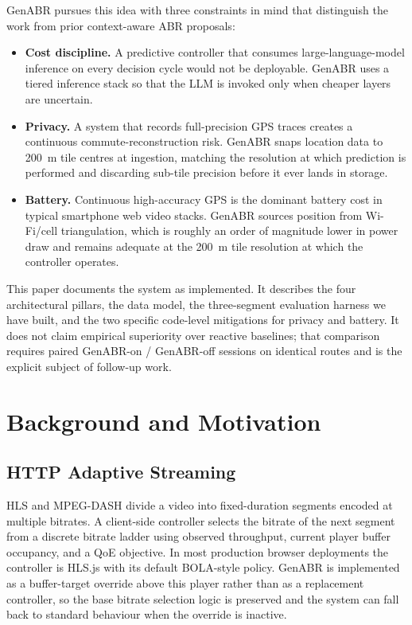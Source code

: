 \documentclass[conference]{IEEEtran}
\begin{document}
GenABR pursues this idea with three constraints in mind that distinguish
the work from prior context-aware ABR proposals:
\begin{itemize}
  \item \textbf{Cost discipline.} A predictive controller that consumes
        large-language-model inference on every decision cycle would not
        be deployable. GenABR uses a tiered inference stack so that the
        LLM is invoked only when cheaper layers are uncertain.
  \item \textbf{Privacy.} A system that records full-precision GPS
        traces creates a continuous commute-reconstruction risk. GenABR
        snaps location data to 200~m tile centres at ingestion, matching
        the resolution at which prediction is performed and discarding
        sub-tile precision before it ever lands in storage.
  \item \textbf{Battery.} Continuous high-accuracy GPS is the dominant
        battery cost in typical smartphone web video stacks. GenABR
        sources position from Wi-Fi/cell triangulation, which is roughly
        an order of magnitude lower in power draw and remains adequate
        at the 200~m tile resolution at which the controller operates.
\end{itemize}

This paper documents the system as implemented. It describes the four
architectural pillars, the data model, the three-segment evaluation
harness we have built, and the two specific code-level mitigations for
privacy and battery. It does not claim empirical superiority over reactive
baselines; that comparison requires paired GenABR-on / GenABR-off sessions
on identical routes and is the explicit subject of follow-up work.

\section{Background and Motivation}

\subsection{HTTP Adaptive Streaming}
HLS \cite{hls} and MPEG-DASH \cite{dash} divide a video into fixed-duration
segments encoded at multiple bitrates. A client-side controller selects the
bitrate of the next segment from a discrete bitrate ladder using observed
throughput, current player buffer occupancy, and a QoE objective. In most
production browser deployments the controller is HLS.js with its default
BOLA-style policy. GenABR is implemented as a buffer-target override above
this player rather than as a replacement controller, so the base bitrate
selection logic is preserved and the system can fall back to standard
behaviour when the override is inactive.
\end{document}
